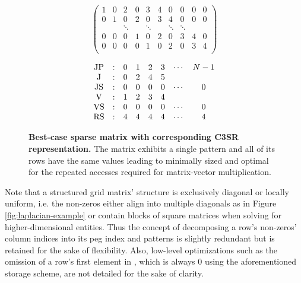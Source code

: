 \documentclass{article}
\begin{document}
    \begin{figure}[ht]
      \centering
      \begin{minipage}{0.5\textwidth}
        \centering
        $$
        \begin{pmatrix}
          1 & 0 & 2 & 0 & 3 & 4 & 0 & 0 & 0 & 0 \\
          0 & 1 & 0 & 2 & 0 & 3 & 4 & 0 & 0 & 0 \\
            &   & \ddots &   & \ddots &   & \ddots & \ddots \\
          0 & 0 & 0 & 1 & 0 & 2 & 0 & 3 & 4 & 0 \\
          0 & 0 & 0 & 0 & 1 & 0 & 2 & 0 & 3 & 4 \\
        \end{pmatrix}
        $$
      \end{minipage}
      \begin{minipage}{0.4\textwidth}
        \centering
        $$
        \begin{matrix}
          \JP & : & 0 & 1 & 2 & 3 & \cdots & N-1 \\
           \J & : & 0 & 2 & 4 & 5 &        &     \\
          \JS & : & 0 & 0 & 0 & 0 & \cdots &  0  \\
           \V & : & 1 & 2 & 3 & 4 &        &     \\
          \VS & : & 0 & 0 & 0 & 0 & \cdots &  0  \\
          \RS & : & 4 & 4 & 4 & 4 & \cdots &  4  \\
        \end{matrix}
        $$
      \end{minipage}
      \caption[Best-case sparse matrix with corresponding C3SR representation.]{\textbf{Best-case sparse matrix with corresponding C3SR representation.} The matrix exhibits a single pattern and all of its rows have the same values leading to minimally sized \J and \V optimal for the repeated accesses required for matrix-vector multiplication.}
      \label{fig:c3sr-example-best-case}
    \end{figure}

    Note that a structured grid matrix' structure is exclusively diagonal or locally uniform, i.e. the non-zeros either align into multiple diagonals as in Figure \ref{fig:laplacian-example} or contain blocks of square matrices when solving for higher-dimensional entities. Thus the concept of decomposing a row's non-zeros' column indices into its peg index and patterns is slightly redundant but is retained for the sake of flexibility. Also, low-level optimizations such as the omission of a row's first element in \J, which is always $0$ using the aforementioned storage scheme, are not detailed for the sake of clarity.
\end{document}
